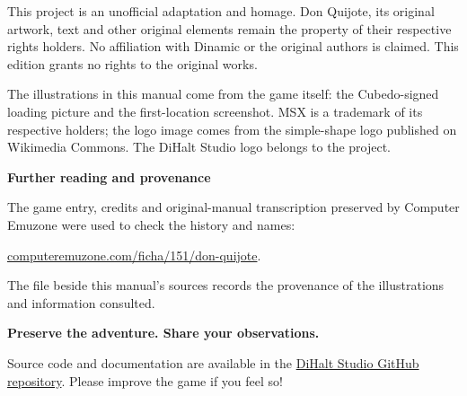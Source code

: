 This project is an unofficial adaptation and homage. Don Quijote, its original artwork, text and other original elements remain the property of their respective rights holders. No affiliation with Dinamic or the original authors is claimed. This edition grants no rights to the original works.

The illustrations in this manual come from the game itself: the Cubedo-signed loading picture and the first-location screenshot. MSX is a trademark of its respective holders; the logo image comes from the simple-shape logo published on Wikimedia Commons. The DiHalt Studio logo belongs to the project.

\textbf{Further reading and provenance}\par
The game entry, credits and original-manual transcription preserved by Computer Emuzone were used to check the history and names:\par
\href{https://computeremuzone.com/ficha/151/don-quijote}{computeremuzone.com/ficha/151/don-quijote}.\par
The  file beside this manual's sources records the provenance of the illustrations and information consulted.

\vfill
\textcolor{accent}{\textbf{Preserve the adventure. Share your observations.}}\par
Source code and documentation are available in the \href{https://github.com/DiHaltStudio/donquijote-msx1-opl4-en-es}{DiHalt Studio GitHub repository}. Please improve the game if you feel so!
